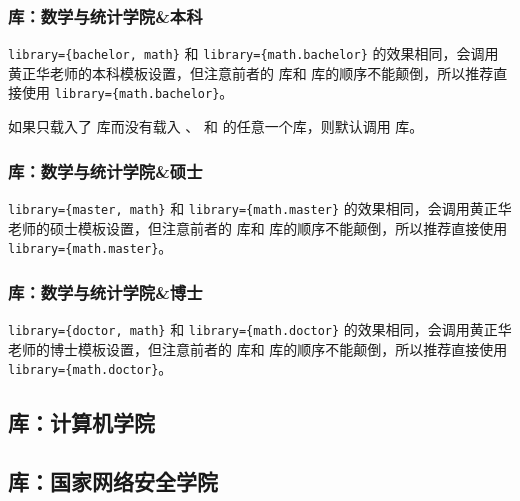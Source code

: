 \subsubsection{ 库：数学与统计学院\&本科}

\verb|library={bachelor, math}| 和 \verb|library={math.bachelor}| 的效果相同，会调用黄正华老师的本科模板设置，但注意前者的  库和  库的顺序不能颠倒，所以推荐直接使用 \verb|library={math.bachelor}|。

如果只载入了  库而没有载入 、 和  的任意一个库，则默认调用  库。


\subsubsection{ 库：数学与统计学院\&硕士}


\verb|library={master, math}| 和 \verb|library={math.master}| 的效果相同，会调用黄正华老师的硕士模板设置，但注意前者的  库和  库的顺序不能颠倒，所以推荐直接使用 \verb|library={math.master}|。


\subsubsection{ 库：数学与统计学院\&博士}


\verb|library={doctor, math}| 和 \verb|library={math.doctor}| 的效果相同，会调用黄正华老师的博士模板设置，但注意前者的  库和  库的顺序不能颠倒，所以推荐直接使用 \verb|library={math.doctor}|。

\subsection{ 库：计算机学院}


\subsection{ 库：国家网络安全学院}
